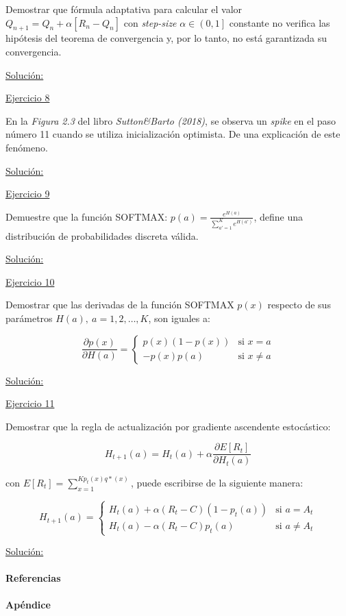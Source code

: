 \documentclass[12pt]{article}
\newlength\tindent
\renewcommand{\indent}{\hspace*{\tindent}}
\begin{document}
    Demostrar que fórmula adaptativa para calcular el valor $Q_{n+1}=Q_n+\alpha\left[R_n-Q_n\right]$ con  \textit{step-size} $\alpha\in\left(0,1\right]$ constante no verifica las hipótesis del teorema de convergencia y, por lo tanto, no está garantizada su convergencia.

    \indent\underline{Solución:}

    \lipsum[2]

    \indent\underline{Ejercicio 8}

    En la \textit{Figura 2.3} del libro \textit{Sutton\&Barto (2018)}, se observa un \textit{spike} en el paso número 11 cuando se utiliza inicialización optimista.
    De una explicación de este fenómeno.

    \indent\underline{Solución:}

    \lipsum[2]

    \indent\underline{Ejercicio 9}

    Demuestre que la función SOFTMAX: $p(a)=\frac{e^{H(a)}}{\sum_{a'=1}^{K} e^{H(a')}}$, define una distribución de probabilidades discreta válida.

    \indent\underline{Solución:}

    \lipsum[2]

    \indent\underline{Ejercicio 10}

    Demostrar que las derivadas de la función SOFTMAX $p(x)$ respecto de sus parámetros $H(a),\ a=1,2,\dots,K$, son iguales a:

    \[
        \frac{\partial p(x)}{\partial H(a)} =
        \begin{cases}
            p(x)(1-p(x))    &\text{si $x = a$} \\
            -p(x)p(a)       &\text{si $x\neq a$}
        \end{cases}
    \]

    \indent\underline{Solución:}

    \lipsum[2]

    \indent\underline{Ejercicio 11}

    Demostrar que la regla de actualización por gradiente ascendente estocástico:

    \[H_{t+1}(a) = H_t (a) + \alpha \frac{\partial E[R_t] }{\partial H_t(a)}\]

    con $E[R_t] = \sum_{x=1}^{K p_t(x)q*(x)}$, puede escribirse de la siguiente manera:

    \[
        H_{t+1}(a) =
        \begin{cases}
            H_t (a) + \alpha (R_t - C)(1-p_t(a))    &\text{si $a = A_t$} \\
            H_t (a) - \alpha (R_t - C)p_t(a)        &\text{si $a \neq A_t$}
        \end{cases}
    \]

    \indent\underline{Solución:}

    \lipsum[5]

    \paragraph{Referencias}\label{sec:references}
    \lipsum[5]

    \paragraph{Apéndice}\label{sec:appendix}

    \lipsum[5]
\end{document}
